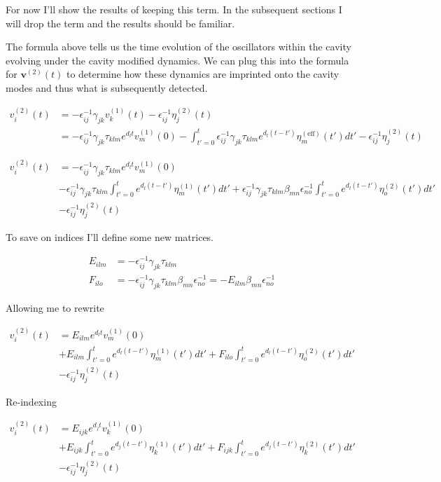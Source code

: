 \documentclass[12pt]{article}
\newcommand{\bv}[1]{\boldsymbol{#1}}
\begin{document}
For now I'll show the results of keeping this term. In the subsequent sections I will drop the term and the results should be familiar.

The formula above tells us the time evolution of the oscillators within the cavity evolving under the cavity modified dynamics. We can plug this into the formula for $\bv{v}^{(2)}(t)$ to determine how these dynamics are imprinted onto the cavity modes and thus what is subsequently detected.

\begin{align}
v^{(2)}_{i}(t) &= -\epsilon^{-1}_{ij}\gamma_{jk}v^{(1)}_{k}(t) - \epsilon^{-1}_{ij}\eta^{(2)}_{j}(t)\\
&= -\epsilon^{-1}_{ij}\gamma_{jk}\tau_{klm}e^{d_l t}v^{(1)}_{m}(0)  -\int_{t'=0}^t \epsilon^{-1}_{ij}\gamma_{jk}\tau_{klm}e^{d_l (t-t')}\eta^{(\text{eff})}_{m}(t')dt' - \epsilon^{-1}_{ij}\eta^{(2)}_{j}(t)
\end{align}

\begin{align}
v^{(2)}_{i}(t)&= -\epsilon^{-1}_{ij}\gamma_{jk}\tau_{klm}e^{d_l t}v^{(1)}_{m}(0)\\
&-\epsilon^{-1}_{ij}\gamma_{jk}\tau_{klm}\int_{t'=0}^{t}e^{d_l (t-t')}\eta^{(1)}_{m}(t') dt' + \epsilon^{-1}_{ij}\gamma_{jk}\tau_{klm}\beta_{mn}\epsilon^{-1}_{no}\int_{t'=0}^t e^{d_l(t-t')}\eta^{(2)}_{o}(t')dt'\\
&-\epsilon^{-1}_{ij}\eta^{(2)}_{j}(t)
\end{align}

To save on indices I'll define some new matrices.

\begin{align}
E_{ilm} &= -\epsilon^{-1}_{ij}\gamma_{jk}\tau_{klm}\\
F_{ilo} &= -\epsilon^{-1}_{ij}\gamma_{jk}\tau_{klm}\beta_{mn}\epsilon^{-1}_{no} = -E_{ilm}\beta_{mn}\epsilon^{-1}_{no}
\end{align}

Allowing me to rewrite

\begin{align}
v^{(2)}_{i}(t) &= E_{ilm}e^{d_l t}v^{(1)}_{m}(0)\\
&+E_{ilm}\int_{t'=0}^t e^{d_l(t-t')}\eta^{(1)}_{m}(t')dt' + F_{ilo}\int_{t'=0}^t e^{d_l(t-t')}\eta^{(2)}_{o}(t')dt'\\
&-\epsilon^{-1}_{ij}\eta^{(2)}_{j}(t)
\end{align}

Re-indexing

\begin{align}
v^{(2)}_{i}(t) &= E_{ijk}e^{d_j t}v^{(1)}_{k}(0)\\
&+E_{ijk}\int_{t'=0}^t e^{d_j(t-t')}\eta^{(1)}_{k}(t')dt' + F_{ijk}\int_{t'=0}^t e^{d_j(t-t')}\eta^{(2)}_{k}(t')dt'\\
&-\epsilon^{-1}_{ij}\eta^{(2)}_{j}(t)
\end{align}
\end{document}
